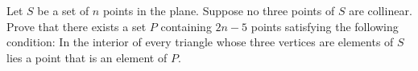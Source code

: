 Let $S$ be a set of $n$ points in the plane. Suppose no three points of $S$ are collinear. Prove that there exists a set $P$ containing $2n - 5$ points satisfying the following condition: In the interior of every triangle whose three vertices are elements of $S$ lies a point that is an element of $P$.
